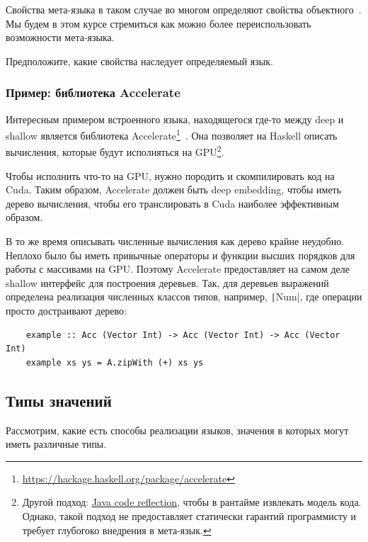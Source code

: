 Свойства мета-языка в таком случае во многом определяют свойства объектного~\cite{reynolds1972definitional,reynolds1998definitional}.
Мы будем в этом курсе стремиться как можно более переиспользовать возможности мета-языка.

\begin{task}
    Предположите, какие свойства наследует определяемый язык.
\end{task}

\subsubsection{Пример: библиотека Accelerate}

Интересным примером встроенного языка, находящегося где-то между deep и shallow является библиотека Accelerate\footnote{\url{https://hackage.haskell.org/package/accelerate}}~\cite[глава 6]{marlow2011parallel}.
Она позволяет на Haskell описать вычисления, которые будут исполняться на GPU\footnote{Другой подход: \href{https://youtu.be/6c0DB2kwF_Q?si=-nB7AkCsDWB_Q-hy}{Java code reflection}, чтобы в рантайме извлекать модель кода. Однако, такой подход не предоставляет статически гарантий программисту и требует глубогоко внедрения в мета-язык.}.

Чтобы исполнить что-то на GPU, нужно породить и скомпилировать код на Cuda.
Таким образом, Accelerate должен быть deep embedding, чтобы иметь дерево вычисления, чтобы его транслировать в Cuda наиболее эффективным образом.

В то же время описывать численные вычисления как дерево крайне неудобно.
Неплохо было бы иметь привычные операторы и функции высших порядков для работы с массивами на GPU\@.
Поэтому Accelerate предоставляет на самом деле shallow интерфейс для построения деревьев.
Так, для деревьев выражений определена реализация численных классов типов, например, \texttt|Num|, где операции просто достраивают дерево:
\begin{verbatim}
    example :: Acc (Vector Int) -> Acc (Vector Int) -> Acc (Vector Int)
    example xs ys = A.zipWith (+) xs ys
\end{verbatim}



\subsection{Типы значений}

Рассмотрим, какие есть способы реализации языков, значения в которых могут иметь различные типы.

